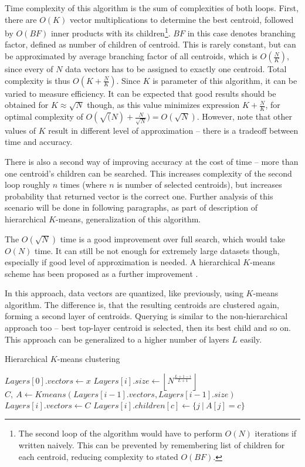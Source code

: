 Time complexity of this algorithm is the sum of complexities of both loops.
First, there are $O(K)$ vector multiplications to determine the best centroid,
followed by $O(BF)$ inner products with its children\footnote{The second loop
of the algorithm would have to perform $O(N)$ iterations if written naively.
This can be prevented by remembering list of children for each centroid,
reducing complexity to stated $O(BF)$.}.
$BF$ in this case denotes
branching factor, defined as number of children of centroid. This is rarely
constant, but can be approximated by average branching factor of all centroids,
which is $O(\frac{N}{K})$, since every of $N$ data vectors has to be assigned
to exactly one centroid. Total complexity is thus $O(K + \frac{N}{K})$. Since
$K$ is parameter of this algorithm, it can be varied to measure efficiency. It
can be expected that good results should be obtained for $K \approx \sqrt{N}$ 
though, as this value minimizes expression $K + \frac{N}{K}$, for optimal
complexity of $O(\sqrt(N) + \frac{N}{\sqrt{N}}) = O(\sqrt{N})$. However, note that other
values of $K$ result in different level of approximation -- there is
a tradeoff between time and accuracy. 

There is also a second way of improving accuracy at the cost of time -- more
than one centroid's children can be searched. This increases complexity of the
second loop roughly $n$ times (where $n$ is number of selected centroids),
but increases probability that returned vector is the correct one. Further
analysis of this scenario will be done in following paragraphs, as part
of description of hierarchical $K$-means, generalization of this algorithm.


\bigskip


The $O(\sqrt{N})$ time is a good improvement over full search, which would
take $O(N)$ time. It can still be not enough for extremely large datasets
though, especially if good level of approximation is needed. A hierarchical
$K$-means scheme has been proposed as a further improvement \cite{kmeans}.

In this approach, data vectors are quantized, like previously,
using $K$-means algorithm.
The difference is, that the resulting centroids are clustered again, forming
a second layer of centroids. Querying is similar to the non-hierarchical
approach too -- best top-layer centroid is selected, then its best child and
so on. This approach can be generalized to a higher number of layers $L$ 
easily.


\begin{algorithm}[H]
	\caption{Hierarchical $K$-means clustering}
	\begin{algorithmic}
		\State $ Layers[0].vectors \gets x $
			\State $ Layers[i].size \gets \left \lfloor N^{\frac{L + 1 - i}{L + 1}} \right \rfloor $
			\State $ C,\ A \gets Kmeans(Layers[i - 1].vectors, Layers[i - 1].size) $
			\State $ Layers[i].vectors \gets C $
				\State $ Layers[i].children[c] \gets \{ j\ |\ A[j] = c \} $
			\EndFor
		\EndFor
		\State {}
	\end{algorithmic}
\end{algorithm}

